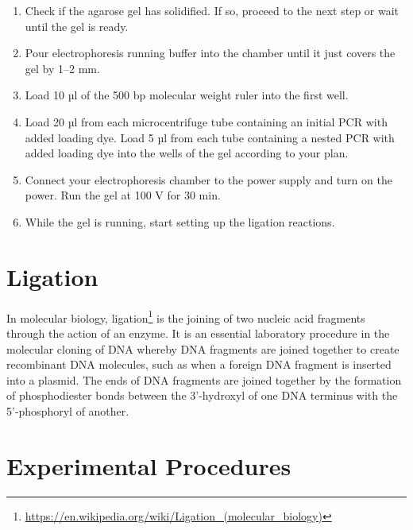 \documentclass[]{book}
\let\rmarkdownfootnote\footnote%
\def\footnote{\protect\rmarkdownfootnote}
\renewcommand{\href}[2]{#2\footnote{\url{#1}}}
\begin{document}
\begin{enumerate}
\item
  Check if the agarose gel has solidified. If so, proceed to the next
  step or wait until the gel is ready.
\item
  Pour electrophoresis running buffer into the chamber until it just
  covers the gel by 1--2 mm.
\item
  Load 10 µl of the 500 bp molecular weight ruler into the first well.
\item
  Load 20 µl from each microcentrifuge tube containing an initial PCR
  with added loading dye. Load 5 µl from each tube containing a nested
  PCR with added loading dye into the wells of the gel according to your
  plan.
\item
  Connect your electrophoresis chamber to the power supply and turn on
  the power. Run the gel at 100 V for 30 min.
\item
  While the gel is running, start setting up the ligation reactions.
\end{enumerate}

\section{Ligation}\label{ligation}

In molecular biology,
\href{https://en.wikipedia.org/wiki/Ligation_(molecular_biology)}{ligation}
is the joining of two nucleic acid fragments through the action of an
enzyme. It is an essential laboratory procedure in the molecular cloning
of DNA whereby DNA fragments are joined together to create recombinant
DNA molecules, such as when a foreign DNA fragment is inserted into a
plasmid. The ends of DNA fragments are joined together by the formation
of phosphodiester bonds between the 3'-hydroxyl of one DNA terminus with
the 5'-phosphoryl of another.

\section{Experimental Procedures}\label{experimental-procedures-14}
\end{document}
